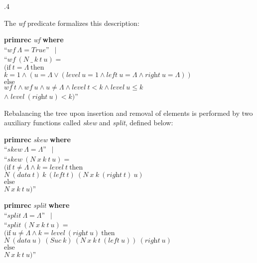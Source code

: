 \documentclass[a4paper,12pt]{article}
\begin{document}
\kern.4\parskip %

The \textit{wf} predicate formalizes this description:

\prew
\textbf{primrec} \textit{wf} \textbf{where} \\
``$\textit{wf}~\Lambda = \textit{True}$'' $\,\mid$ \\
``$\textit{wf}~(N~\_~k~t~u) =$ \\
\phantom{``}$(\textrm{if}~t = \Lambda~\textrm{then}$ \\
\phantom{``$(\quad$}$k = 1 \mathrel{\land} (u = \Lambda \mathrel{\lor} (\textit{level}~u = 1 \mathrel{\land} \textit{left}~u = \Lambda \mathrel{\land} \textit{right}~u = \Lambda))$ \\
\phantom{``$($}$\textrm{else}$ \\
\hbox{}\phantom{``$(\quad$}$\textit{wf}~t \mathrel{\land} \textit{wf}~u
\mathrel{\land} u \not= \Lambda \mathrel{\land} \textit{level}~t < k
\mathrel{\land} \textit{level}~u \le k$ \\
\hbox{}\phantom{``$(\quad$}${\land}\; \textit{level}~(\textit{right}~u) < k)$''
\postw

Rebalancing the tree upon insertion and removal of elements is performed by two
auxiliary functions called \textit{skew} and \textit{split}, defined below:

\prew
\textbf{primrec} \textit{skew} \textbf{where} \\
``$\textit{skew}~\Lambda = \Lambda$'' $\,\mid$ \\
``$\textit{skew}~(N~x~k~t~u) = {}$ \\
\phantom{``}$(\textrm{if}~t \not= \Lambda \mathrel{\land} k =
\textit{level}~t~\textrm{then}$ \\
\phantom{``(\quad}$N~(\textit{data}~t)~k~(\textit{left}~t)~(N~x~k~
(\textit{right}~t)~u)$ \\
\phantom{``(}$\textrm{else}$ \\
\phantom{``(\quad}$N~x~k~t~u)$''
\postw

\prew
\textbf{primrec} \textit{split} \textbf{where} \\
``$\textit{split}~\Lambda = \Lambda$'' $\,\mid$ \\
``$\textit{split}~(N~x~k~t~u) = {}$ \\
\phantom{``}$(\textrm{if}~u \not= \Lambda \mathrel{\land} k =
\textit{level}~(\textit{right}~u)~\textrm{then}$ \\
\phantom{``(\quad}$N~(\textit{data}~u)~(\textit{Suc}~k)~
(N~x~k~t~(\textit{left}~u))~(\textit{right}~u)$ \\
\phantom{``(}$\textrm{else}$ \\
\phantom{``(\quad}$N~x~k~t~u)$''
\postw
\end{document}
